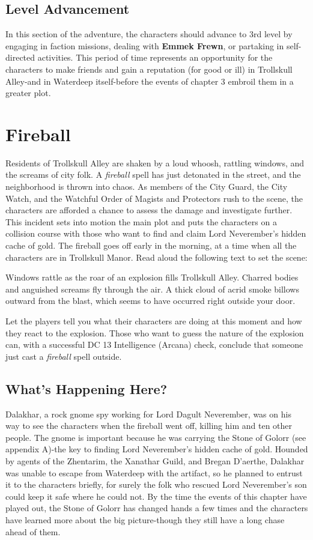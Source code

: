 \documentclass[10pt,a4paper,twoside,twocolumn,openany,nodeprecatedcode]{dndbook}
\begin{document}
\section{Level Advancement}
In this section of the adventure, the characters should advance to 3rd level by engaging in faction missions, dealing with \textbf{Emmek Frewn}, or partaking in self-directed activities. This period of time represents an opportunity for the characters to make friends and gain a reputation (for good or ill) in Trollskull Alley-and in Waterdeep itself-before the events of chapter 3 embroil them in a greater plot.
\chapter{Fireball}
Residents of Trollskull Alley are shaken by a loud whoosh, rattling windows, and the screams of city folk. A \textit{fireball} spell has just detonated in the street, and the neighborhood is thrown into chaos. As members of the City Guard, the City Watch, and the Watchful Order of Magists and Protectors rush to the scene, the characters are afforded a chance to assess the damage and investigate further. This incident sets into motion the main plot and puts the characters on a collision course with those who want to find and claim Lord Neverember's hidden cache of gold.
The fireball goes off early in the morning, at a time when all the characters are in Trollskull Manor. Read aloud the following text to set the scene:
\begin{DndReadAloud}{}
Windows rattle as the roar of an explosion fills Trollskull Alley. Charred bodies and anguished screams fly through the air. A thick cloud of acrid smoke billows outward from the blast, which seems to have occurred right outside your door.
\end{DndReadAloud}

Let the players tell you what their characters are doing at this moment and how they react to the explosion. Those who want to guess the nature of the explosion can, with a successful DC 13 Intelligence (Arcana) check, conclude that someone just cast a \textit{fireball} spell outside.
\section{What's Happening Here?}
Dalakhar, a rock gnome spy working for Lord Dagult Neverember, was on his way to see the characters when the fireball went off, killing him and ten other people. The gnome is important because he was carrying the Stone of Golorr (see appendix A)-the key to finding Lord Neverember's hidden cache of gold. Hounded by agents of the Zhentarim, the Xanathar Guild, and Bregan D'aerthe, Dalakhar was unable to escape from Waterdeep with the artifact, so he planned to entrust it to the characters briefly, for surely the folk who rescued Lord Neverember's son could keep it safe where he could not.
By the time the events of this chapter have played out, the Stone of Golorr has changed hands a few times and the characters have learned more about the big picture-though they still have a long chase ahead of them.
\end{document}
